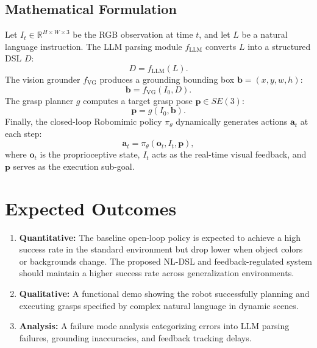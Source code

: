 \documentclass[conference]{IEEEtran}
\begin{document}
\subsection{Mathematical Formulation}
Let $I_t \in \mathbb{R}^{H\times W\times 3}$ be the RGB observation at time $t$, and let $L$ be a natural language instruction. The LLM parsing module $f_{\text{LLM}}$ converts $L$ into a structured DSL $D$:
\begin{equation}
    D = f_{\text{LLM}}(L).
\end{equation}
The vision grounder $f_{\text{VG}}$ produces a grounding bounding box $\mathbf{b} = (x, y, w, h)$:
\begin{equation}
    \mathbf{b} = f_{\text{VG}}(I_0, D).
\end{equation}
The grasp planner $g$ computes a target grasp pose $\mathbf{p} \in SE(3)$:
\begin{equation}
    \mathbf{p} = g(I_0, \mathbf{b}).
\end{equation}
Finally, the closed-loop Robomimic policy $\pi_\theta$ dynamically generates actions $\mathbf{a}_t$ at each step:
\begin{equation}
    \mathbf{a}_t = \pi_\theta(\mathbf{o}_t, I_t, \mathbf{p}),
\end{equation}
where $\mathbf{o}_t$ is the proprioceptive state, $I_t$ acts as the real-time visual feedback, and $\mathbf{p}$ serves as the execution sub-goal.

\section{Expected Outcomes}
\label{sec:outcomes}

\begin{enumerate}
    \item \textbf{Quantitative:} The baseline open-loop policy is expected to achieve a high success rate in the standard environment but drop lower when object colors or backgrounds change. The proposed NL-DSL and feedback-regulated system should maintain a higher success rate across generalization environments.
    \item \textbf{Qualitative:} A functional demo showing the robot successfully planning and executing grasps specified by complex natural language in dynamic scenes.
    \item \textbf{Analysis:} A failure mode analysis categorizing errors into LLM parsing failures, grounding inaccuracies, and feedback tracking delays.
\end{enumerate}
\end{document}

